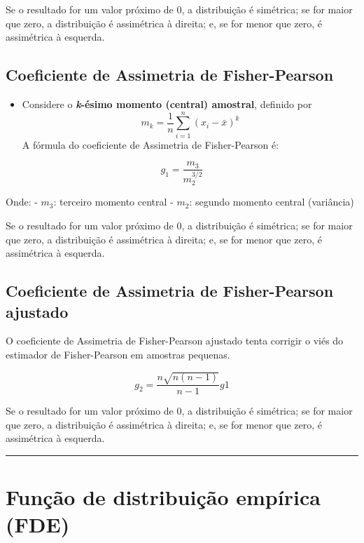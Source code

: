 \documentclass[
]{book}
\providecommand{\tightlist}{%
  \setlength{\itemsep}{0pt}\setlength{\parskip}{0pt}}
\begin{document}
Se o resultado for um valor próximo de 0, a distribuição é simétrica; se for maior que zero, a distribuição é assimétrica à direita; e, se for menor que zero, é assimétrica à esquerda.

\subsection{Coeficiente de Assimetria de Fisher-Pearson}\label{coeficiente-de-assimetria-de-fisher-pearson}

\begin{itemize}
\tightlist
\item
  Considere o \textbf{\emph{k}-ésimo momento (central) amostral}, definido por
  \[
  m_k = \frac{1}{n}\sum_{i=1}^{n}\left(x_i-\bar{x}\right)^k
  \]
  A fórmula do coeficiente de Assimetria de Fisher-Pearson é:
\end{itemize}

\[
g_1 = \frac{m_3}{m_2^{3/2}}
\]

Onde:
- \(m_3\): terceiro momento central
- \(m_2\): segundo momento central (variância)

Se o resultado for um valor próximo de 0, a distribuição é simétrica; se for maior que zero, a distribuição é assimétrica à direita; e, se for menor que zero, é assimétrica à esquerda.

\subsection{Coeficiente de Assimetria de Fisher-Pearson ajustado}\label{coeficiente-de-assimetria-de-fisher-pearson-ajustado}

O coeficiente de Assimetria de Fisher-Pearson ajustado tenta corrigir o viés do estimador de Fisher-Pearson em amostras pequenas.

\[
g_2 = \frac{n\sqrt{n(n-1)}}{n-1}g1
\]

Se o resultado for um valor próximo de 0, a distribuição é simétrica; se for maior que zero, a distribuição é assimétrica à direita; e, se for menor que zero, é assimétrica à esquerda.

\begin{center}\rule{0.5\linewidth}{0.5pt}\end{center}

\section{Função de distribuição empírica (FDE)}\label{funuxe7uxe3o-de-distribuiuxe7uxe3o-empuxedrica-fde}
\end{document}
